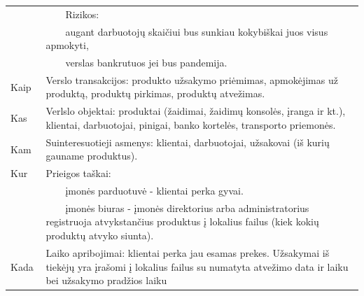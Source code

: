 \documentclass{VUMIFPSkursinis}
\newcommand{\tabitem}{~~\llap{\textbullet}~~}
\newcommand{\tabitemd}{~~\llap{\textopenbullet}~~}
\begin{document}
\begin{center}
\begin{table}[ht]
\begin{tabular}{| p{0.1\linewidth} | p{0.9\linewidth }|}
		&\hspace{4mm}\tabitem Rizikos: \\
		&\hspace{8mm}\tabitemd augant darbuotojų skaičiui bus sunkiau kokybiškai juos visus apmokyti, \\
		&\hspace{8mm}\tabitemd verslas bankrutuos jei bus pandemija. \\ \hline
	Kaip 	&  Verslo transakcijos: produkto užsakymo priėmimas, apmokėjimas už produktą, produktų pirkimas, produktų atvežimas. \\ \hline
	Kas 	& Verlslo objektai: produktai (žaidimai, žaidimų konsolės, įranga ir kt.), klientai, darbuotojai, pinigai, banko kortelės, transporto priemonės. \\ \hline
	Kam 	& Suinteresuotieji asmenys: klientai, darbuotojai, užsakovai (iš kurių gauname produktus). \\ \hline
	Kur 	& Prieigos taškai: \\
		&\hspace{4mm}\tabitem įmonės parduotuvė - klientai perka gyvai.\\ 
		&\hspace{4mm}\tabitem įmonės biuras - įmonės direktorius arba administratorius registruoja atvykstančius produktus į lokalius failus (kiek kokių produktų atvyko siunta). \\ \hline
	Kada 	& Laiko apribojimai: klientai perka jau esamas prekes. Užsakymai iš tiekėjų yra įrašomi į lokalius failus su numatyta atvežimo data ir laiku bei užsakymo pradžios laiku\\ \hline																				
	\end{tabular}
\end{table}	
\end{center}
\newpage
\end{document}
